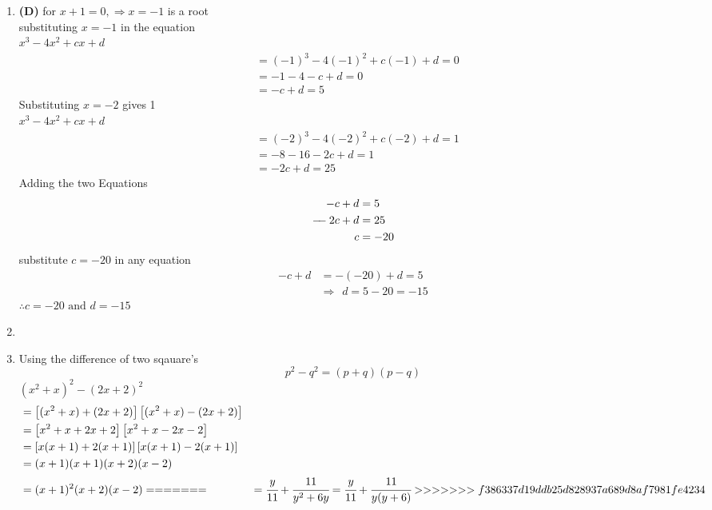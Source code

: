 \begin{multicols}{2}
\begin{enumerate}[label={\textbf{\arabic*.}}]
    
    \item \textbf{(D)} for $x + 1 = 0,  \Rightarrow x = -1 $ is a root \\
    substituting $x = -1$ in the equation \\
    $x^3 -4x^2 +cx + d$ 
    \begin{align*}
        &= (-1)^3 -4(-1)^2 + c(-1) + d = 0 \\
        & = -1 -4 -c + d = 0 \\
        & = -c + d = 5
    \end{align*}
    Substituting $x = -2$ gives 1 \\
    $x^3 -4x^2 +cx + d$
    \begin {align*}
     &= (-2)^3 -4(-2)^2 + c(-2) + d = 1 \\
    & = -8 -16 -2c + d = 1 \\
    & = -2c + d = 25
    \end{align*}
    Adding the two Equations
    \begin{align*}
         -c + d &= 5 \\
        -\hspace{-5pt} -2c + d &= 25 \\
        c &= -20
    \end{align*} 
    substitute $c= -20$ in any equation 
    \begin{align*}
        -c + d &= -(-20) +d = 5 \\
        & \Rightarrow \hspace{5pt}   d = 5 - 20  = -15
    \end{align*}
    $\therefore c = -20 \text{ and } d = -15$
    
    \item 

    \item Using the difference of two sqauare's \\
    $$p^2 - q^2 = (p + q)(p - q)$$
    $(x^2 +x)^2 - (2x + 2)^2$
    \begin{align*}
         &= \left[(x^2 + x) + (2x + 2)\right]\left[(x^2 +x ) - (2x + 2)\right] \\
         &= \left[x^2 + x + 2x + 2\right]\left[x^2 +x  -2x - 2\right] \\
         &= \left[x(x+ 1) + 2(x+ 1)\right]\left[x(x+1) -2(x+1)\right] \\
         & = (x+1)(x+1)(x+2)(x-2) \\
         & = (x+1)^2(x+2)(x-2)
=======
        & = \cfrac{y}{11} + \cfrac{11}{y^2 + 6y} = \cfrac{y}{11} + \cfrac{11}{y(y + 6)}
>>>>>>> f386337d19ddb25d828937a689d8af7981fe4234
    \end{align*}
    

\end{enumerate}
\end{multicols}

